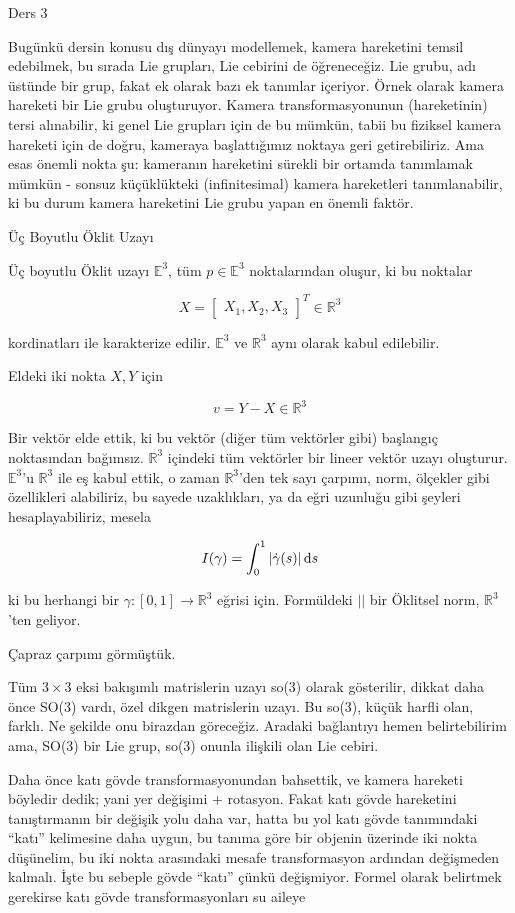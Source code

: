 \documentclass[12pt,fleqn]{article}\usepackage{../../common}
\begin{document}
Ders 3

Bugünkü dersin konusu dış dünyayı modellemek, kamera hareketini temsil
edebilmek, bu sırada Lie grupları, Lie cebirini de öğreneceğiz. Lie grubu,
adı üstünde bir grup, fakat ek olarak bazı ek tanımlar içeriyor. Örnek
olarak kamera hareketi bir Lie grubu oluşturuyor. Kamera transformasyonunun
(hareketinin) tersi alınabilir, ki genel Lie grupları için de bu mümkün,
tabii bu fiziksel kamera hareketi için de doğru, kameraya başlattığımız
noktaya geri getirebiliriz. Ama esas önemli nokta şu: kameranın hareketini
sürekli bir ortamda tanımlamak mümkün - sonsuz küçüklükteki (infinitesimal)
kamera hareketleri tanımlanabilir, ki bu durum kamera hareketini Lie grubu
yapan en önemli faktör.

Üç Boyutlu Öklit Uzayı

Üç boyutlu Öklit uzayı $\mathbb{E}^3$, tüm $p \in \mathbb{E}^3$ noktalarından oluşur, ki bu noktalar

$$ X = \left[\begin{array}{ccc} X_1,X_2,X_3 \end{array}\right]^T \in \mathbb{R}^3$$

kordinatları ile karakterize edilir. $\mathbb{E}^3$ ve $\mathbb{R}^3$ aynı
olarak kabul edilebilir. 

Eldeki iki nokta $X,Y$ için

$$ v = Y - X \in \mathbb{R}^3$$

Bir vektör elde ettik, ki bu vektör (diğer tüm vektörler gibi) başlangıç
noktasından bağımsız. $\mathbb{R}^3$ içindeki tüm vektörler bir lineer
vektör uzayı oluşturur. $\mathbb{E}^3$'u $\mathbb{R}^3$ ile eş kabul ettik,
o zaman $\mathbb{R}^3$'den tek sayı çarpımı, norm, ölçekler gibi
özellikleri alabiliriz, bu sayede uzaklıkları, ya da eğri uzunluğu gibi
şeyleri hesaplayabiliriz, mesela 

$$ I(\gamma) = \int _{0}^{1} | \dot{\gamma}(s)| \,\mathrm{d} s $$

ki bu herhangi bir $\gamma: [0,1] \to \mathbb{R}^3$ eğrisi için. Formüldeki $||$
bir Öklitsel norm, $\mathbb{R}^3$'ten geliyor.

Çapraz çarpımı görmüştük.

Tüm $3 \times 3$ eksi bakışımlı matrislerin uzayı so(3) olarak gösterilir,
dikkat daha önce SO(3) vardı, özel dikgen matrislerin uzayı. Bu so(3),
küçük harfli olan, farklı. Ne şekilde onu birazdan göreceğiz. Aradaki
bağlantıyı hemen belirtebilirim ama, SO(3) bir Lie grup, so(3) onunla
ilişkili olan Lie cebiri. 

Daha önce katı gövde transformasyonundan bahsettik, ve kamera hareketi
böyledir dedik; yani yer değişimi + rotasyon. Fakat katı gövde hareketini
tanıştırmanın bir değişik yolu daha var, hatta bu yol katı gövde
tanımındaki ``katı'' kelimesine daha uygun, bu tanıma göre bir objenin
üzerinde iki nokta düşünelim, bu iki nokta arasındaki mesafe transformasyon
ardından değişmeden kalmalı. İşte bu sebeple gövde ``katı'' çünkü
değişmiyor. Formel olarak belirtmek gerekirse katı gövde transformasyonları
su aileye
\end{document}
